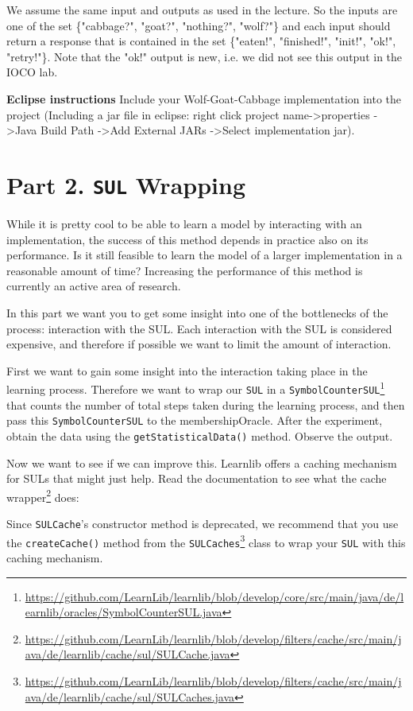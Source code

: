 \documentclass[a4paper]{article}
\begin{document}
We assume the same input and outputs as used in the lecture. So the inputs are one of the set \{"cabbage?", "goat?", "nothing?", "wolf?"\} and each input should return a response that is contained in the set \{"eaten!", "finished!", "init!", "ok!", "retry!"\}. Note that the "ok!" output is new, i.e. we did not see this output in the IOCO lab.

\medskip
\textbf{Eclipse instructions} Include your Wolf-Goat-Cabbage implementation into the project (Including a jar file in eclipse: right click project name-\textgreater properties  -\textgreater Java Build Path  -\textgreater  Add External JARs  -\textgreater  Select implementation jar).



\section*{Part 2. \texttt{SUL} Wrapping}
While it is pretty cool to be able to learn a model by interacting with an implementation, the success of this method depends in practice also on its performance. Is it still feasible to learn the model of a larger implementation in a reasonable amount of time? Increasing the performance of this method is currently an active area of research.

In this part we want you to get some insight into one of the bottlenecks of the process: interaction with the SUL. Each interaction with the SUL is considered expensive, and therefore if possible we want to limit the amount of interaction.
 
\medskip
First we want to gain some insight into the interaction taking place in the learning process. Therefore we want to wrap our \texttt{SUL} in a \texttt{SymbolCounterSUL}\footnote{\url{https://github.com/LearnLib/learnlib/blob/develop/core/src/main/java/de/learnlib/oracles/SymbolCounterSUL.java}} that counts the number of total steps taken during the learning process, and then pass this \texttt{SymbolCounterSUL} to the membershipOracle. After the experiment, obtain the data using the \texttt{getStatisticalData()} method. Observe the output.

\medskip
Now we want to see if we can improve this. Learnlib offers a caching mechanism for SULs that might just help. Read the documentation to see what the cache wrapper\footnote{\url{https://github.com/LearnLib/learnlib/blob/develop/filters/cache/src/main/java/de/learnlib/cache/sul/SULCache.java}} does:


Since \texttt{SULCache}'s constructor method is deprecated, we recommend that you use the \texttt{createCache()} method from the \texttt{SULCaches}\footnote{\url{https://github.com/LearnLib/learnlib/blob/develop/filters/cache/src/main/java/de/learnlib/cache/sul/SULCaches.java}} class to wrap your \texttt{SUL} with this caching mechanism. 
\end{document}
